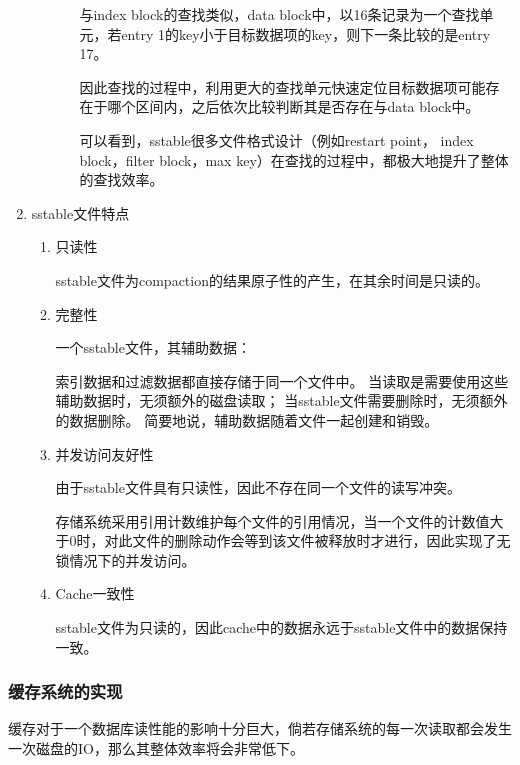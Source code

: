 \begin{enumerate}
\begin{enumerate}
\begin{enumerate}
与index block的查找类似，data block中，以16条记录为一个查找单元，若entry 1的key小于目标数据项的key，则下一条比较的是entry 17。

因此查找的过程中，利用更大的查找单元快速定位目标数据项可能存在于哪个区间内，之后依次比较判断其是否存在与data block中。

可以看到，sstable很多文件格式设计（例如restart point， index block，filter block，max key）在查找的过程中，都极大地提升了整体的查找效率。



		\end{enumerate}
			
				\end{enumerate}
				

				\item sstable文件特点
				
				\begin{enumerate}
					\item 只读性

sstable文件为compaction的结果原子性的产生，在其余时间是只读的。

\item 完整性

一个sstable文件，其辅助数据：

索引数据和过滤数据都直接存储于同一个文件中。
当读取是需要使用这些辅助数据时，无须额外的磁盘读取；
当sstable文件需要删除时，无须额外的数据删除。
简要地说，辅助数据随着文件一起创建和销毁。

\item 并发访问友好性

由于sstable文件具有只读性，因此不存在同一个文件的读写冲突。

存储系统采用引用计数维护每个文件的引用情况，当一个文件的计数值大于0时，对此文件的删除动作会等到该文件被释放时才进行，因此实现了无锁情况下的并发访问。

\item Cache一致性

sstable文件为只读的，因此cache中的数据永远于sstable文件中的数据保持一致。
				\end{enumerate}
			\end{enumerate}


		\subsubsection{缓存系统的实现}

		缓存对于一个数据库读性能的影响十分巨大，倘若存储系统的每一次读取都会发生一次磁盘的IO，那么其整体效率将会非常低下。

